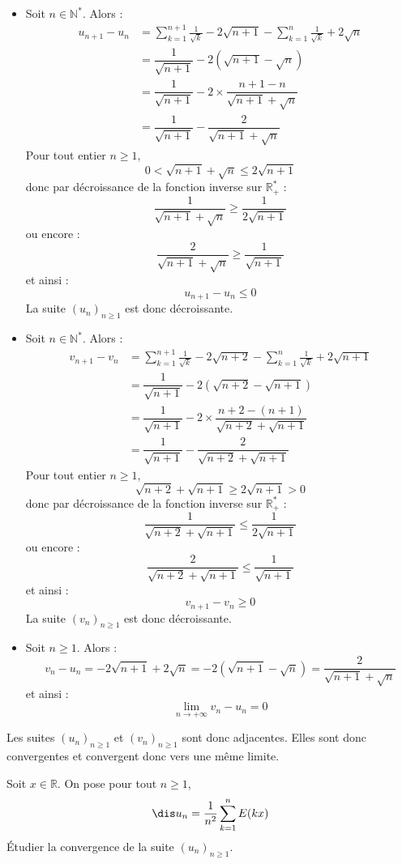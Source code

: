 \documentclass[a4paper,10pt]{report}
\begin{document}
\begin{itemize}
\item Soit $n \in \mathbb{N}^*$. Alors :
\begin{align*}
u_{n+1}-u_n & =  \sum_{k = 1}^{n+1} {\frac{1}{\sqrt k}} - 2\sqrt{n+1}  -\sum_{k = 1}^n {\frac{1}{\sqrt k}} + 2\sqrt{n}  \\
& = \dfrac{1}{\sqrt{n+1}} - 2 (\sqrt{n+1}-\sqrt{n}) \\
& = \dfrac{1}{\sqrt{n+1}} - 2 \times \dfrac{n+1-n}{\sqrt{n+1}+ \sqrt{n}} \\
& = \dfrac{1}{\sqrt{n+1}} - \dfrac{2}{\sqrt{n+1}+ \sqrt{n}}
\end{align*}
Pour tout entier $n \geq 1$,
$$ 0< \sqrt{n+1} + \sqrt{n} \leq 2 \sqrt{n+1}$$
donc par décroissance de la fonction inverse sur $\mathbb{R}_+^{*}$ :
$$ \dfrac{1}{\sqrt{n+1}+ \sqrt{n}} \geq \dfrac{1}{2 \sqrt{n+1}}$$
ou encore :
$$ \dfrac{2}{\sqrt{n+1}+\sqrt{n}} \geq \dfrac{1}{\sqrt{n+1}}$$
et ainsi :
$$ u_{n+1}-u_n \leq 0$$
La suite $(u_n)_{n \geq 1}$ est donc décroissante.
\item Soit $n \in \mathbb{N}^*$. Alors :
\begin{align*}
v_{n+1}-v_n & =  \sum_{k = 1}^{n+1} {\frac{1}{\sqrt k}} - 2\sqrt{n+2}  -\sum_{k = 1}^n {\frac{1}{\sqrt k}} + 2\sqrt{n+1}  \\
& = \dfrac{1}{\sqrt{n+1}} - 2 (\sqrt{n+2}-\sqrt{n+1}) \\
& = \dfrac{1}{\sqrt{n+1}} - 2 \times \dfrac{n+2-(n+1)}{\sqrt{n+2}+ \sqrt{n+1}} \\
& = \dfrac{1}{\sqrt{n+1}} - \dfrac{2}{\sqrt{n+2}+ \sqrt{n+1}}
\end{align*}
Pour tout entier $n \geq 1$,
$$ \sqrt{n+2} + \sqrt{n+1} \geq 2 \sqrt{n+1} > 0$$
donc par décroissance de la fonction inverse sur $\mathbb{R}_+^{*}$ :
$$ \dfrac{1}{\sqrt{n+2}+ \sqrt{n+1}} \leq \dfrac{1}{2 \sqrt{n+1}}$$
ou encore :
$$ \dfrac{2}{\sqrt{n+2}+\sqrt{n+1}} \leq \dfrac{1}{\sqrt{n+1}}$$
et ainsi :
$$ v_{n+1}-v_n \geq 0$$
La suite $(v_n)_{n \geq 1}$ est donc décroissante.
\item Soit $n \geq 1$. Alors :
$$ v_n- u_n = -2 \sqrt{n+1} + 2 \sqrt{n} = -2 (\sqrt{n+1}-\sqrt{n}) = \dfrac{2}{\sqrt{n+1}+\sqrt{n}}$$
et ainsi :
$$ \lim_{n \rightarrow + \infty} v_n -u_n = 0$$
\end{itemize}
Les suites $(u_n)_{n \geq 1}$ et $(v_n)_{n \geq 1}$ sont donc adjacentes. Elles sont donc convergentes et convergent donc vers une même limite.


 \medskip
 
\begin{Exercice}{} Soit $x \in \mathbb{R}$. On pose pour tout $n \geq 1$, 
$$\dis u_n = \frac{1}{n^2} \sum_{k=1}^n E(kx)$$
Étudier la convergence de la suite $(u_n)_{n \geq 1}$.
\end{Exercice}
\end{document}
